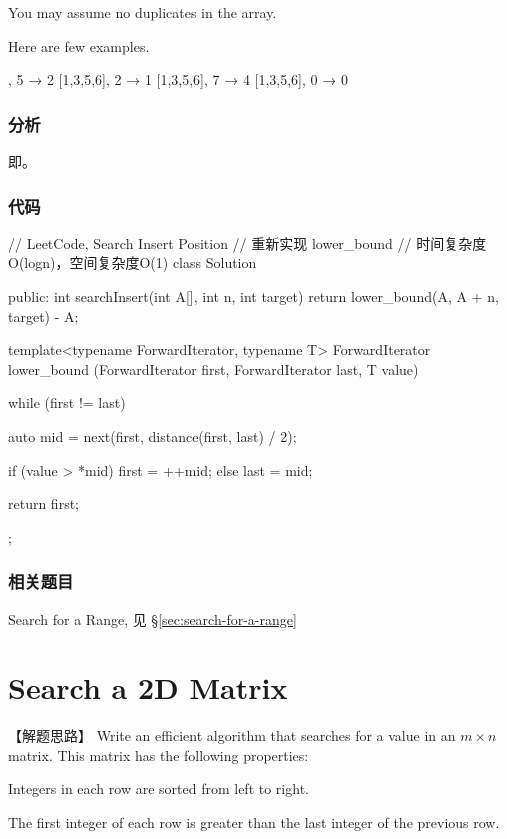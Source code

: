 You may assume no duplicates in the array.

Here are few examples.
\begin{Code}
	[1,3,5,6], 5 → 2
	[1,3,5,6], 2 → 1
	[1,3,5,6], 7 → 4
	[1,3,5,6], 0 → 0
\end{Code}


\subsubsection{分析}
即。


\subsubsection{代码}
\begin{Code}
	// LeetCode, Search Insert Position
	// 重新实现 lower_bound
	// 时间复杂度O(logn)，空间复杂度O(1)
	class Solution {
		public:
		int searchInsert(int A[], int n, int target) {
			return lower_bound(A, A + n, target) - A;
		}
		
		template<typename ForwardIterator, typename T>
		ForwardIterator lower_bound (ForwardIterator first,
		ForwardIterator last, T value) {
			while (first != last) {
				auto mid = next(first, distance(first, last) / 2);
				
				if (value > *mid)   first = ++mid;
				else                last = mid;
			}
			
			return first;
		}
	};
\end{Code}


\subsubsection{相关题目}
\begindot
\item Search for a Range, 见 \S \ref{sec:search-for-a-range}
\myenddot


\section{Search a 2D Matrix} %
\label{sec:search-a-2d-matrix}


【解题思路】
Write an efficient algorithm that searches for a value in an $m \times n$ matrix. This matrix has the following properties:
\begindot
\item Integers in each row are sorted from left to right.
\item The first integer of each row is greater than the last integer of the previous row.
\myenddot

